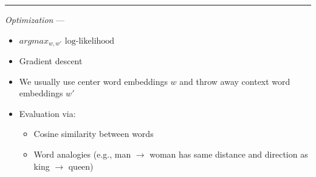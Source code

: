{\color{lightgray}\hrule height 0.001mm}

\emph{Optimization} ---
\begin{itemize}
    \item $argmax_{w,w'} \textrm{ log-likelihood}$
    \item Gradient descent
    \item We usually use center word embeddings $w$ and throw away context word embeddings $w'$
    \item Evaluation via:
    \begin{itemize}
        \item Cosine similarity between words
        \item Word analogies (e.g., man $\to$ woman has same distance and direction as king $\to$ queen)
    \end{itemize}
\end{itemize}